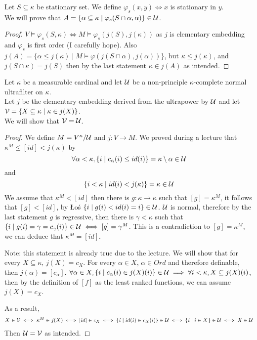 \subquestion{}
Let $S \subseteq \kappa$ be stationary set.
We define $\varphi_s(x, y) \iff x$ is stationary in $y$. \\
We will prove that $A = \{\alpha \subseteq \kappa \mid \varphi_s(S \cap \alpha, \alpha) \} \in \mathcal{U}$.
\begin{proof}
	$V \models \varphi_s(S, \kappa) \iff M \models \varphi_s(j(S), j(\kappa))$ as $j$ is elementary embedding and $\varphi_s$ is first order (I carefully hope).
	Also $j(A) = \{ \alpha \le j(\kappa) \mid M \models \varphi(j(S \cap \alpha), j(\alpha)) \}$, but $\kappa \le j(\kappa)$, and $j(S \cap \kappa) = j(S)$ then by the last statement $\kappa \in j(A)$ as intended.
\end{proof}

\question{}
Let $\kappa$ be a measurable cardinal and let $\mathcal{U}$ be a non-principle $\kappa$-complete normal ultrafilter on $\kappa$. \\
Let $j$ be the elementary embedding derived from the ultrapower by $\mathcal{U}$ and let $\mathcal{V} = \{ X \subseteq \kappa \mid \kappa \in j(X) \}$. \\
We will show that $\mathcal{V} = \mathcal{U}$.
\begin{proof}
	We define $M = V^\kappa / \mathcal{U}$ and $j : V \to M$.
	We proved during a lecture that $\kappa^M \le [id] < j(\kappa)$ by
	\[
		\forall \alpha < \kappa, \{ i \mid c_\alpha(i) \le id(i) \} = \kappa \setminus \alpha \in \mathcal{U}
	\]
	and
	\[
		\{ i < \kappa \mid id(i) < j(\kappa) \} = \kappa \in \mathcal{U}
	\]
	We assume that $\kappa^M < [id]$ then there is $g : \kappa \to \kappa$ such that $[g] = \kappa^M$, it follows that $[g] < [id]$, by Łoś $\{ i \mid g(i) < id(i) = i \} \in \mathcal{U}$.
	$\mathcal{U}$ is normal, therefore by the last statement $g$ is regressive, then there is $\gamma < \kappa$ such that $\{ i \mid g(i) = \gamma = c_\gamma(i) \} \in \mathcal{U} \iff [g] = \gamma^M$.
	This is a contradiction to $[g] = \kappa^M$, we can deduce that $\kappa^M = [id]$.

	Note: this statement is already true due to the lecture.
	We will show that for every $X \subseteq \kappa$, $j(X) = c_X$.
	For every $\alpha \in X$, $\alpha \in Ord$ and therefore definable, then $j(\alpha) = [c_\alpha]$.
	$\forall \alpha \in X, \{ i \mid c_\alpha(i) \in j(X)(i) \} \in \mathcal{U} \implies \forall i < \kappa, X \subseteq j(X)(i)$, then by the definition of $[f]$ as the least ranked functions, we can assume $j(X) = c_X$.

	As a result,
	\begin{align*}
		X \in \mathcal{V}
		\iff \kappa^M \in j(X)
		\iff [id] \in c_X
		\iff \{ i \mid id(i) \in c_X(i) \} \in \mathcal{U}
		\iff \{ i \mid i \in X \} \in \mathcal{U}
		\iff X \in \mathcal{U}
	\end{align*}
	Then $\mathcal{U} = \mathcal{V}$ as intended.
\end{proof}


